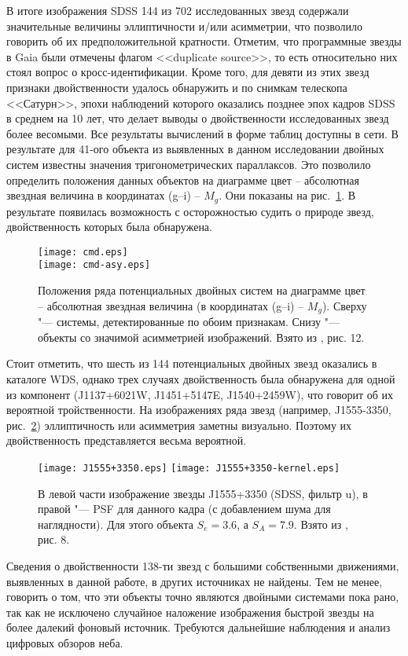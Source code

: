 В итоге изображения SDSS 144 из 702 исследованных звезд содержали значительные величины эллиптичности и/или асимметрии, что позволило говорить об их предположительной кратности. Отметим, что программные звезды в Gaia были отмечены флагом <<duplicate source>>, то есть относительно них стоял вопрос о кросс-идентификации. Кроме того, для девяти из этих звезд признаки двойственности удалось обнаружить и по снимкам телескопа <<Сатурн>>, эпохи наблюдений которого оказались позднее эпох кадров SDSS в среднем на 10 лет, что делает выводы о двойственности исследованных звезд более весомыми. Все результаты вычислений в форме таблиц доступны в сети. В результате для 41-ого объекта из выявленных в данном исследовании двойных систем известны значения тригонометрических параллаксов. Это позволило определить положения данных объектов на диаграмме цвет -- абсолютная звездная величина в координатах (g--i) -- $M_g$. Они показаны на рис.~\ref{fig:cmd}. В результате появилась возможность с осторожностью судить о природе звезд, двойственность которых была обнаружена.

\begin{figure}[pt]
\centering
\texttt{[image: cmd.eps]}\\
\texttt{[image: cmd-asy.eps]}
\caption{Положения ряда потенциальных двойных систем на диаграмме цвет -- абсолютная звездная величина (в координатах (g--i) -- $M_g$). Сверху "--- системы, детектированные по обоим признакам. Снизу "--- объекты со значимой асимметрией изображений. Взято из \cite{2018AstL...44..103K}, рис. 12.}
\label{fig:cmd}
\end{figure}

Стоит отметить, что шесть из 144 потенциальных двойных звезд оказались в каталоге WDS, однако  трех случаях двойственность была обнаружена для одной из компонент (J1137+6021W, J1451+5147E, J1540+2459W), что говорит об их вероятной тройственности. 
На изображениях ряда звезд (например, J1555-3350, рис.~\ref{fig:J1555+3350}) эллиптичность или асимметрия заметны визуально. Поэтому их двойственность представляется весьма вероятной.
\begin{figure}[h]
\centering
\texttt{[image: J1555+3350.eps]}
\texttt{[image: J1555+3350-kernel.eps]}
\caption{В левой части изображение звезды J1555+3350 (SDSS, фильтр u), в правой "--- PSF для данного кадра (с добавлением шума для наглядности). Для этого объекта $S_e=3.6$, а $S_A=7.9$. Взято из \cite{2018AstL...44..103K}, рис. 8.}
\label{fig:J1555+3350}
\end{figure}

Сведения о двойственности 138-ти звезд с большими собственными движениями, выявленных в данной работе, в других источниках не найдены. Тем не менее, говорить о том, что эти объекты точно являются двойными системами пока рано, так как не исключено случайное наложение изображения быстрой звезды на более далекий фоновый источник. Требуются дальнейшие наблюдения и анализ цифровых обзоров неба.
